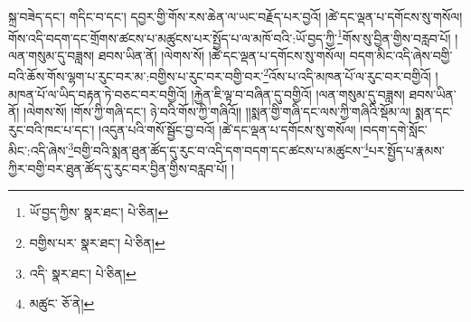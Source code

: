 སྐྲ་བཟེད་དང་། གདིང་བ་དང་། དབྱར་གྱི་གོས་རས་ཆེན་ལ་ཡང་བརྗོད་པར་བྱའོ། །ཚེ་དང་ལྡན་པ་དགོངས་སུ་གསོལ། གོས་འདི་བདག་དང་གྲོགས་ཚངས་པ་མཚུངས་པར་སྤྱོད་པ་ལ་མཁོ་བའི་:ཡོ་བྱད་ཀྱི་\footnote{ཡོ་བྱད་ཀྱིས་  སྣར་ཐང་།  པེ་ཅིན། }གོས་སུ་བྱིན་གྱིས་བརླབ་པོ། །ལན་གསུམ་དུ་བཟླས། ཐབས་ཡིན་ནོ། །ལེགས་སོ། །ཚེ་དང་ལྡན་པ་དགོངས་སུ་གསོལ། བདག་མིང་འདི་ཞེས་བགྱི་བའི་ཆོས་གོས་ལྷག་པ་རུང་བར་མ་:བགྱིས་པ་རུང་བར་བགྱི་བར་\footnote{བགྱིས་པར་  སྣར་ཐང་།  པེ་ཅིན། }འོས་པ་འདི་མཁན་པོ་ལ་རུང་བར་བགྱིའོ། །མཁན་པོ་ལ་ཡིད་བརྟན་ཏེ་བཅང་བར་བགྱིའོ། །རྐྱེན་ཇི་ལྟ་བ་བཞིན་དུ་བགྱིའོ། །ལན་གསུམ་དུ་བཟླས། ཐབས་ཡིན་ནོ། །ལེགས་སོ། །གོས་ཀྱི་གཞི་དང་། ཉེ་བའི་གོས་ཀྱི་གཞིའོ།། །།སྨན་གྱི་གཞི་དང་ལས་ཀྱི་གཞིའི་སྡོམ་ལ། སྨན་དང་རུང་བའི་ཁང་པ་དང་། །འདུན་པའི་གསོ་སྦྱོང་བྱ་བའོ། །ཚེ་དང་ལྡན་པ་དགོངས་སུ་གསོལ། །བདག་དགེ་སློང་མིང་:འདི་ཞེས་\footnote{འདི་  སྣར་ཐང་།  པེ་ཅིན། }བགྱི་བའི་སྨན་ཐུན་ཚོད་དུ་རུང་བ་འདི་དག་བདག་དང་ཚངས་པ་མཚུངས་\footnote{མཚུང་  ཅོ་ནེ། }པར་སྤྱོད་པ་རྣམས་ཀྱིར་བགྱི་བར་ཐུན་ཚོད་དུ་རུང་བར་བྱིན་གྱིས་བརླབ་པོ། །

